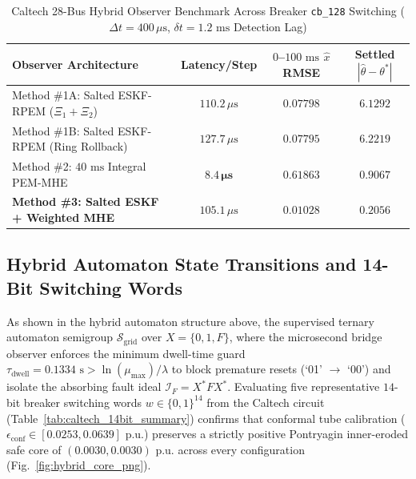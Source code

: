 \documentclass[11pt]{article}
\begin{document}
\begin{table}[!t]
\centering
\caption{Caltech 28-Bus Hybrid Observer Benchmark Across Breaker \texttt{cb\_128} Switching ($\Delta t = 400\,\mu\text{s}$, $\delta t = 1.2\text{ ms}$ Detection Lag)}
\label{tab:observer_benchmark}
\scriptsize
\setlength{\tabcolsep}{3.2pt}
\renewcommand{\arraystretch}{1.15}
\begin{tabular}{@{}lccc@{}}
\toprule
\textbf{Observer Architecture} & \textbf{Latency/Step} & \textbf{$0$--$100\text{ ms}$ $\hat{x}$ RMSE} & \textbf{Settled $|\hat{\theta} - \theta^*|$} \\
\midrule
Method \#1A: Salted ESKF-RPEM ($\Xi_1 + \Xi_2$) & $110.2\,\mu\text{s}$ & $0.07798$ & $6.1292$ \\
Method \#1B: Salted ESKF-RPEM (Ring Rollback) & $127.7\,\mu\text{s}$ & $0.07795$ & $6.2219$ \\
Method \#2: $40\text{ ms}$ Integral PEM-MHE & $\mathbf{8.4\,\mu\text{s}}$ & $0.61863$ & $0.9067$ \\
\textbf{Method \#3: Salted ESKF + Weighted MHE} & $105.1\,\mu\text{s}$ & $\mathbf{0.01028}$ & $\mathbf{0.2056}$ \\
\bottomrule
\end{tabular}
\end{table}

\subsection{Hybrid Automaton State Transitions and 14-Bit Switching Words}
As shown in the hybrid automaton structure above, the supervised ternary automaton semigroup $\mathcal{S}_{\text{grid}}$ over $X = \{0, 1, F\}$, where the microsecond bridge observer enforces the minimum dwell-time guard $\tau_{\text{dwell}} = 0.1334\text{ s} > \ln(\mu_{\max})/\lambda$ to block premature resets (`01' $\to$ `00') and isolate the absorbing fault ideal $\mathcal{I}_F = X^* F X^*$. Evaluating five representative $14$-bit breaker switching words $w \in \{0, 1\}^{14}$ from the Caltech circuit (Table~\ref{tab:caltech_14bit_summary}) confirms that conformal tube calibration ($\epsilon_{\text{conf}} \in [0.0253, 0.0639]\text{ p.u.}$) preserves a strictly positive Pontryagin inner-eroded safe core of $(0.0030, 0.0030)\text{ p.u.}$ across every configuration (Fig.~\ref{fig:hybrid_core_png}).
\end{document}
